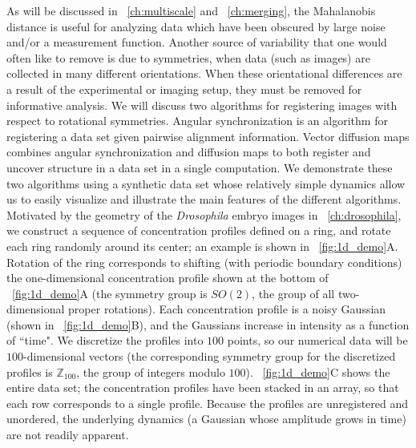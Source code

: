 As will be discussed in \chap~\ref{ch:multiscale} and \chap~\ref{ch:merging}, the Mahalanobis distance is useful for analyzing data which have been obscured by large noise and/or a measurement function.
%
Another source of variability that one would often like to remove is due to symmetries, when data (such as images) are collected in many different orientations.
%
When these orientational differences are a result of the experimental or imaging setup, they must be removed for informative analysis.
%
We will discuss two algorithms for registering images with respect to rotational symmetries.
%
Angular synchronization \cite{singer2011angular} is an algorithm for registering a data set given pairwise alignment information.
%
Vector diffusion maps \cite{singer2012vector} combines angular synchronization and diffusion maps to both register and uncover structure in a data set in a single computation.
%
We demonstrate these two algorithms using a synthetic data set whose relatively simple dynamics allow us to easily visualize and illustrate the main features of the different algorithms.
%
Motivated by the geometry of the {\em Drosophila} embryo images in \chap~\ref{ch:drosophila}, we construct a sequence of concentration profiles defined on a ring, and rotate each ring randomly around its center; an example is shown in \fig~\ref{fig:1d_demo}A.
%
Rotation of the ring corresponds to shifting (with periodic boundary conditions) the one-dimensional concentration profile shown at the bottom of \fig~\ref{fig:1d_demo}A (the symmetry group is $SO(2)$, the group of all two-dimensional proper rotations).
%
Each concentration profile is a noisy Gaussian (shown in \fig~\ref{fig:1d_demo}B), and the Gaussians increase in intensity as a function of ``time".
%
We discretize the profiles into $100$ points, so our numerical data will be $100$-dimensional vectors (the corresponding symmetry group for the discretized profiles is $\mathbb{Z}_{100}$, the group of integers modulo $100$).
%
\fig~\ref{fig:1d_demo}C shows the entire data set; the concentration profiles have been stacked in an array, so that each row corresponds to a single profile.
%
Because the profiles are unregistered and unordered, the underlying dynamics (a Gaussian whose amplitude grows in time) are not readily apparent.

